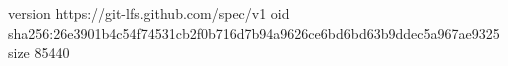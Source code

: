 version https://git-lfs.github.com/spec/v1
oid sha256:26e3901b4c54f74531cb2f0b716d7b94a9626ce6bd6bd63b9ddec5a967ae9325
size 85440
